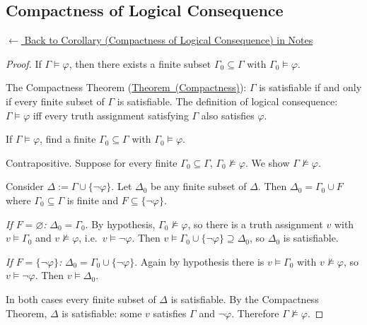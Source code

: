
\subsection*{Compactness of Logical Consequence}
\label{prf:consequence-compact}

\begin{remark*}[Return]
\hyperref[cor:consequence-compact]{$\leftarrow$ Back to Corollary (Compactness of Logical Consequence) in Notes}
\end{remark*}

\begin{proof}
\Claim If $\Gamma \models \varphi$, then there exists a finite subset $\Gamma_0 \subseteq \Gamma$ with $\Gamma_0 \models \varphi$.

\Given The Compactness Theorem
(\hyperref[thm:compactness]{Theorem~(Compactness)}): $\Gamma$ is satisfiable
if and only if every finite subset of $\Gamma$ is satisfiable. The definition
of logical consequence: $\Gamma \models \varphi$ iff every truth assignment
satisfying $\Gamma$ also satisfies $\varphi$.

\Goal If $\Gamma \models \varphi$, find a finite $\Gamma_0 \subseteq \Gamma$
with $\Gamma_0 \models \varphi$.

\Strategy Contrapositive. Suppose for every finite $\Gamma_0 \subseteq \Gamma$,
$\Gamma_0 \not\models \varphi$. We show $\Gamma \not\models \varphi$.

Consider $\Delta := \Gamma \cup \{\neg\varphi\}$. Let $\Delta_0$ be any finite
subset of $\Delta$. Then $\Delta_0 = \Gamma_0 \cup F$ where $\Gamma_0
\subseteq \Gamma$ is finite and $F \subseteq \{\neg\varphi\}$.

\textit{If $F = \varnothing$:} $\Delta_0 = \Gamma_0$. By hypothesis,
$\Gamma_0 \not\models \varphi$, so there is a truth assignment $v$ with $v
\models \Gamma_0$ and $v \not\models \varphi$, i.e.\ $v \models \neg\varphi$.
Then $v \models \Gamma_0 \cup \{\neg\varphi\} \supseteq \Delta_0$, so $\Delta_0$
is satisfiable.

\textit{If $F = \{\neg\varphi\}$:} $\Delta_0 = \Gamma_0 \cup \{\neg\varphi\}$.
Again by hypothesis there is $v \models \Gamma_0$ with $v \not\models \varphi$,
so $v \models \neg\varphi$. Then $v \models \Delta_0$.

In both cases every finite subset of $\Delta$ is satisfiable. By the
Compactness Theorem, $\Delta$ is satisfiable: some $v$ satisfies $\Gamma$ and
$\neg\varphi$. Therefore $\Gamma \not\models \varphi$. \AsReq
\end{proof}

